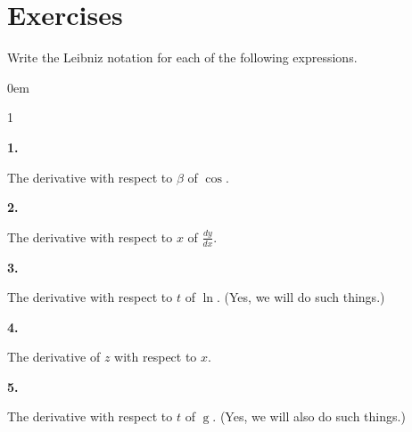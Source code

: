 \documentclass[12pt,]{book}
\theoremstyle{plain}
\theoremstyle{definition}
\numberwithin{equation}{section}
\newenvironment{exercisegroup}%
{\medskip\noindent}%
{\par\bigskip}%
\newlength{\exercisegroupindent}%
\newlength{\exercisegroupitemwidth}%
\newenvironment{exercisegrouplist}%
{\vspace{-\partopsep}%
\begin{adjustwidth}{\exercisegroupindent}{0em}}%
{\end{adjustwidth}%
\vspace{-\partopsep}%
\vspace{\baselineskip}}%
\newenvironment{exercisegroupbycol}[1]%
{\begin{exercisegrouplist}%
\vspace{-\multicolsep}%
\begin{multicols}{#1}%
\setlength{\parindent}{0em}%
\setlength{\exercisegroupitemwidth}{\linewidth}}%
{\end{multicols}%
\vspace{-\multicolsep}%
\end{exercisegrouplist}}%
\newenvironment{exercisegroupitem}[1]%
{\begin{minipage}[t]{\exercisegroupitemwidth}
\vspace{0pt}%
{\bfseries#1}%
\rule{0pt}{\baselineskip}}{\strut%
\end{minipage}%
\hspace{\columnsep}}%
\providecommand\phantomsection{}
\newcommand{\fe}[2]{\mathop{{#1}{\left(#2\right)}}}
\newcommand{\lz}[2]{\frac{d#1}{d#2}}
\begin{document}
\section*{Exercises}\label{exercises-28}

\begin{exercisegroup}%
Write the Leibniz notation for each of the following expressions.%
\begin{exercisegroupbycol}{1}%
\begin{exercisegroupitem}{1. }\phantomsection\hypertarget{exercise-225}{\null}
The derivative with respect to \(\beta\) of \(\fe{\cos}{\beta}\).%
\end{exercisegroupitem}%
\par%
\begin{exercisegroupitem}{2. }\phantomsection\hypertarget{exercise-226}{\null}
The derivative with respect to \(x\) of \(\lz{y}{x}\).%
\end{exercisegroupitem}%
\par%
\begin{exercisegroupitem}{3. }\phantomsection\hypertarget{exercise-227}{\null}
The derivative with respect to \(t\) of \(\fe{\ln}{t}\).  (Yes, we will do such things.)%
\end{exercisegroupitem}%
\par%
\begin{exercisegroupitem}{4. }\phantomsection\hypertarget{exercise-228}{\null}
The derivative of \(z\) with respect to \(x\).%
\end{exercisegroupitem}%
\par%
\begin{exercisegroupitem}{5. }\phantomsection\hypertarget{exercise-229}{\null}
The derivative with respect to \(t\) of \(\fe{g}{8}\).  (Yes, we will also do such things.)%
\end{exercisegroupitem}%
\par%
\end{exercisegroupbycol}%
\end{exercisegroup}%
\typeout{************************************************}
\typeout{************************************************}
\end{document}
